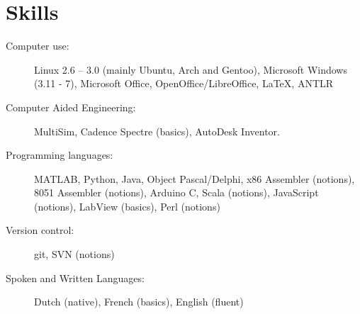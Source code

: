 \documentclass[a4paper]{article}
\begin{document}
\section*{Skills}

\begin{description}
  \item[Computer use:]
    Linux 2.6 -- 3.0 (mainly Ubuntu, Arch and Gentoo),
    Microsoft Windows (3.11 - 7), Microsoft Office, OpenOffice/LibreOffice, \LaTeX, ANTLR
  \item[Computer Aided Engineering:] MultiSim, Cadence Spectre (basics), AutoDesk Inventor.
  \item[Programming languages:]
    MATLAB, Python, Java, Object Pascal/Delphi, x86 Assembler (notions), 8051 Assembler (notions),
    Arduino C, Scala (notions), JavaScript (notions), LabView (basics), Perl (notions)
  \item[Version control:] git, SVN (notions)
  \item[Spoken and Written Languages:] Dutch (native), French (basics), English (fluent)
\end{description}



\bigskip

\begin{center}
\end{center}
\end{document}
